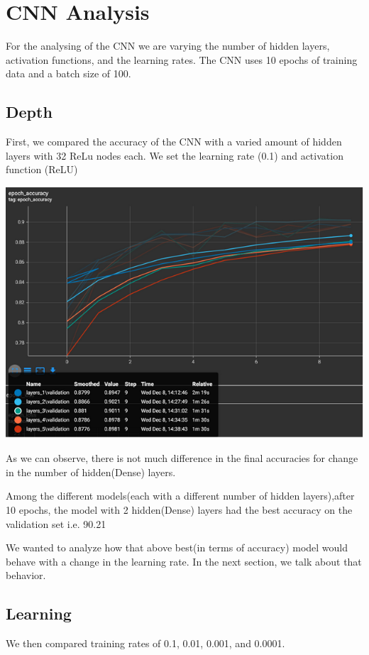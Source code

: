 \documentclass[12pt]{article}
\begin{document}
\section{CNN Analysis}

For the analysing of the CNN we are varying the number of hidden layers, activation functions, and the learning rates. The CNN uses 10 epochs of training data and a batch size of 100. 

\subsection{Depth}

First, we compared the accuracy of the CNN with a varied amount of hidden layers with 32 ReLu nodes each. We set the learning rate (0.1) and activation function (ReLU)

\includegraphics[scale=.75]{cnngraph1.PNG}

As we can observe, there is not much difference in the final accuracies for change in the number of hidden(Dense) layers.

Among the different models(each with a different number of hidden layers),after 10 epochs, the model with 2 hidden(Dense) layers had the best accuracy on the validation set i.e. 90.21%

We wanted to analyze how that above best(in terms of accuracy) model would behave with a change in the learning rate. In the next section, we talk about that behavior.

\subsection{Learning}
We then compared training rates of 0.1, 0.01, 0.001, and 0.0001.
\end{document}
